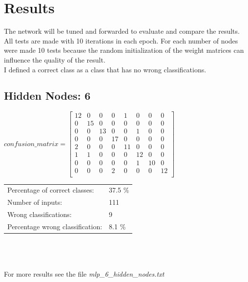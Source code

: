 \documentclass[10pt,a4paper]{article}
\begin{document}
 	\section{Results}						%
 	The network will be tuned and forwarded to evaluate and compare the results. All tests are made with 10 iterations in each epoch. For each number of nodes were made 10 tests because the random initialization of the weight matrices can influence the quality of the result.
 	\\
 	I defined a correct class as a class that has no wrong classifications.
 	\subsection{Hidden Nodes: 6}
 	\begin{center}
 		$ confusion\_matrix = \begin{bmatrix}
 		12& 0& 0& 0& 1& 0& 0& 0  \\
 		0& 15& 0& 0& 0& 0& 0& 0 \\
 		0& 0& 13& 0& 0& 1& 0& 0 \\
 		0& 0& 0& 17& 0& 0& 0& 0 \\
 		2& 0& 0& 0& 11& 0& 0& 0 \\
 		1& 1& 0& 0& 0& 12& 0& 0 \\
 		0& 0& 0& 0& 0& 1& 10& 0 \\
 		0& 0& 0& 2& 0& 0& 0& 12 \\
 		\end{bmatrix}$
 	\end{center}
 	
 	\begin{tabular} {ll}
 		Percentage of correct classes: &  37.5 \% \\
 		Number of inputs: & 111 \\
 		Wrong classifications: & 9 \\
 		Percentage wrong classification: & 8.1 \% \\
 	\end{tabular}
 	\\ 
 	\\ \\
 	For more results see the file \textit{mlp\_6\_hidden\_nodes.txt}
 	
\end{document}
